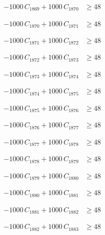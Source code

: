 \documentclass[a4paper,11pt]{article}
\begin{document}
\begin{align}
-1000\,C_{1869} + 1000\,C_{1870} &\geq 48 \nonumber
\end{align}

\begin{align}
-1000\,C_{1870} + 1000\,C_{1871} &\geq 48 \nonumber
\end{align}

\begin{align}
-1000\,C_{1871} + 1000\,C_{1872} &\geq 48 \nonumber
\end{align}

\begin{align}
-1000\,C_{1872} + 1000\,C_{1873} &\geq 48 \nonumber
\end{align}

\begin{align}
-1000\,C_{1873} + 1000\,C_{1874} &\geq 48 \nonumber
\end{align}

\begin{align}
-1000\,C_{1874} + 1000\,C_{1875} &\geq 48 \nonumber
\end{align}

\begin{align}
-1000\,C_{1875} + 1000\,C_{1876} &\geq 48 \nonumber
\end{align}

\begin{align}
-1000\,C_{1876} + 1000\,C_{1877} &\geq 48 \nonumber
\end{align}

\begin{align}
-1000\,C_{1877} + 1000\,C_{1878} &\geq 48 \nonumber
\end{align}

\begin{align}
-1000\,C_{1878} + 1000\,C_{1879} &\geq 48 \nonumber
\end{align}

\begin{align}
-1000\,C_{1879} + 1000\,C_{1880} &\geq 48 \nonumber
\end{align}

\begin{align}
-1000\,C_{1880} + 1000\,C_{1881} &\geq 48 \nonumber
\end{align}

\begin{align}
-1000\,C_{1881} + 1000\,C_{1882} &\geq 48 \nonumber
\end{align}

\begin{align}
-1000\,C_{1882} + 1000\,C_{1883} &\geq 48 \nonumber
\end{align}
\end{document}
